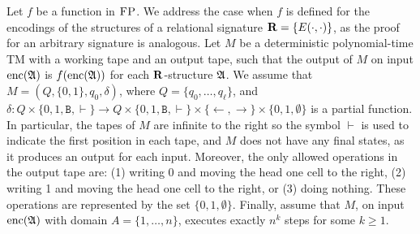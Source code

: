 
\newcommand{\ttB}{\mathtt{B}}
\newcommand{\successor}{\text{succ}}

Let $f$ be a function in $\text{\sc FP}$. We address the case when $f$ is defined for the encodings of the structures of a relational signature $\mathbf{R} = \{ E(\cdot, \cdot) \}$, as the proof for an arbitrary signature is analogous.
 Let $M$ be a deterministic polynomial-time TM with a working tape and an output tape, such that the output of $M$ on input ${\rm enc}(\mathfrak{A})$ is $f({\rm enc}(\mathfrak{A}))$ for each $\mathbf{R}$-structure $\mathfrak{A}$. We assume that $M = (Q,\{0,1\},q_0,\delta)$, 
 where $Q = \{q_0,\ldots,q_{\ell}\}$, and $\delta:Q\times\{0,1,\ttB, \vdash\}\to Q\times\{0,1,\ttB, \vdash\}\times \{\leftarrow,\rightarrow\}\times\{0,1,\emptyset\}$ is a partial function. In particular, the tapes of $M$ are infinite to the right so the symbol $\vdash$ is used to indicate the first position in each tape, and $M$ does not have any final states, as it produces an output for each input. Moreover, the only allowed operations in the output tape are: 
 (1) writing 0 and moving the head one cell to the right, (2) writing 1 and moving the head one cell to the right, or (3) doing nothing. These operations are represented by the set $\{0,1,\emptyset\}$. Finally, assume that $M$, on input ${\rm enc}(\mathfrak{A})$ with domain $A = \{1,\dots,n\}$, executes exactly $n^k$ steps for some $k \geq 1$.

